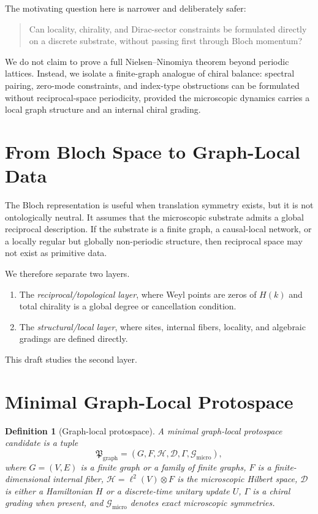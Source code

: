 \documentclass[11pt,a4paper]{article}
\newtheorem{definition}{Definition}
\newcommand{\cH}{\mathcal{H}}
\newcommand{\Graph}{G}
\newcommand{\Gammaop}{\Gamma}
\newcommand{\Pgraph}{\mathfrak{P}_{\mathrm{graph}}}
\begin{document}
The motivating question here is narrower and deliberately safer:
\begin{quote}
Can locality, chirality, and Dirac-sector constraints be formulated directly
on a discrete substrate, without passing first through Bloch momentum?
\end{quote}
We do not claim to prove a full Nielsen--Ninomiya theorem beyond periodic
lattices. Instead, we isolate a finite-graph analogue of chiral balance:
spectral pairing, zero-mode constraints, and index-type obstructions can be
formulated without reciprocal-space periodicity, provided the microscopic
dynamics carries a local graph structure and an internal chiral grading.

\section{From Bloch Space to Graph-Local Data}

The Bloch representation is useful when translation symmetry exists, but it is
not ontologically neutral. It assumes that the microscopic substrate admits a
global reciprocal description. If the substrate is a finite graph, a
causal-local network, or a locally regular but globally non-periodic structure,
then reciprocal space may not exist as primitive data.

We therefore separate two layers.
\begin{enumerate}[label=(\alph*)]
\item The \emph{reciprocal/topological layer}, where Weyl points are zeros of
      $H(k)$ and total chirality is a global degree or cancellation condition.
\item The \emph{structural/local layer}, where sites, internal fibers,
      locality, and algebraic gradings are defined directly.
\end{enumerate}
This draft studies the second layer.

\section{Minimal Graph-Local Protospace}

\begin{definition}[Graph-local protospace]
A minimal graph-local protospace candidate is a tuple
\[
  \Pgraph = (\Graph,F,\cH,\mathcal{D},\Gammaop,\mathcal{G}_{\mathrm{micro}}),
\]
where $\Graph=(V,E)$ is a finite graph or a family of finite graphs, $F$ is a
finite-dimensional internal fiber, $\cH=\ell^2(V)\otimes F$ is the microscopic
Hilbert space, $\mathcal{D}$ is either a Hamiltonian $H$ or a discrete-time
unitary update $U$, $\Gammaop$ is a chiral grading when present, and
$\mathcal{G}_{\mathrm{micro}}$ denotes exact microscopic symmetries.
\end{definition}
\end{document}
